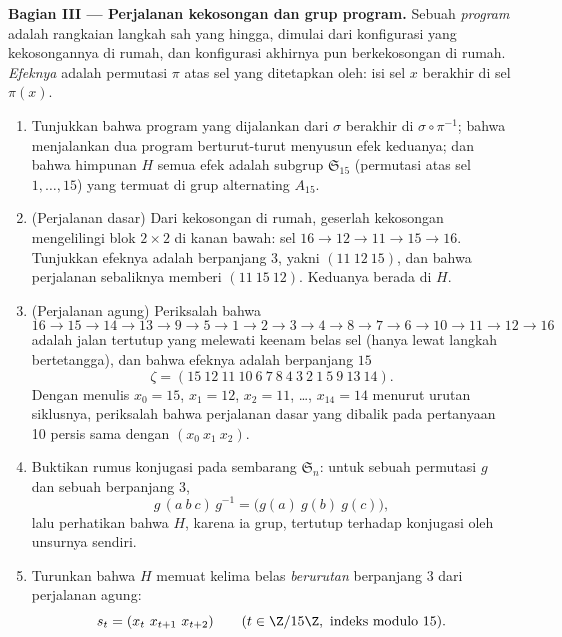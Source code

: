 \begin{problem}
\medskip
\noindent\textbf{Bagian III --- Perjalanan kekosongan dan grup
program.} Sebuah \emph{program} adalah rangkaian langkah sah yang
hingga, dimulai dari konfigurasi yang kekosongannya di rumah, dan
konfigurasi akhirnya pun berkekosongan di rumah. \emph{Efeknya} adalah
permutasi $\pi$ atas sel yang ditetapkan oleh: isi sel $x$ berakhir di
sel $\pi(x)$.
\begin{enumerate}[resume]
  \item Tunjukkan bahwa program yang dijalankan dari $\sigma$ berakhir
        di $\sigma \circ \pi^{-1}$; bahwa menjalankan dua program
        berturut-turut menyusun efek keduanya; dan bahwa himpunan $H$
        semua efek adalah subgrup $\mathfrak{S}_{15}$ (permutasi
        atas sel $1, \dots, 15$) yang termuat di grup
        alternating $A_{15}$.
  \item (Perjalanan dasar) Dari kekosongan di rumah, geserlah
        kekosongan mengelilingi blok $2 \times 2$ di kanan bawah: sel
        $16 \to 12 \to 11 \to 15 \to 16$. Tunjukkan efeknya adalah
         berpanjang $3$, yakni $(11\ 12\ 15)$, dan bahwa perjalanan
        sebaliknya memberi
        $(11\ 15\ 12)$. Keduanya berada di $H$.
  \item (Perjalanan agung) Periksalah bahwa
        \[
        16 \to 15 \to 14 \to 13 \to 9 \to 5 \to 1 \to 2 \to 3
        \to 4 \to 8 \to 7 \to 6 \to 10 \to 11 \to 12 \to 16
        \]
        adalah jalan tertutup yang melewati keenam belas sel (hanya
        lewat langkah bertetangga), dan bahwa efeknya adalah 
        berpanjang $15$
        \[
        \zeta = (15\ 12\ 11\ 10\ 6\ 7\ 8\ 4\ 3\ 2\ 1\ 5\ 9\ 13\
        14) .
        \]
        Dengan menulis $x_0 = 15$, $x_1 = 12$, $x_2 = 11$, \dots, $x_{14}
        = 14$ menurut urutan siklusnya, periksalah bahwa perjalanan
        dasar yang dibalik pada pertanyaan 10 persis sama dengan $(x_0\ x_1\
        x_2)$.
  \item Buktikan rumus konjugasi pada sembarang $\mathfrak{S}_n$: untuk
        sebuah permutasi $g$ dan sebuah  berpanjang $3$,
        \[
        g\,(a\ b\ c)\,g^{-1} = \bigl(g(a)\ g(b)\ g(c)\bigr),
        \]
        lalu perhatikan bahwa $H$, karena ia grup, tertutup terhadap
        konjugasi oleh unsurnya sendiri.
  \item Turunkan bahwa $H$ memuat kelima belas  \emph{berurutan}
        berpanjang $3$ dari perjalanan agung:
        \[
        s_t = (x_t\ x_{t+1}\ x_{t+2}) \qquad (t \in \Z/15\Z,
        \text{ indeks modulo } 15).
        \]
\end{enumerate}


\end{problem}
